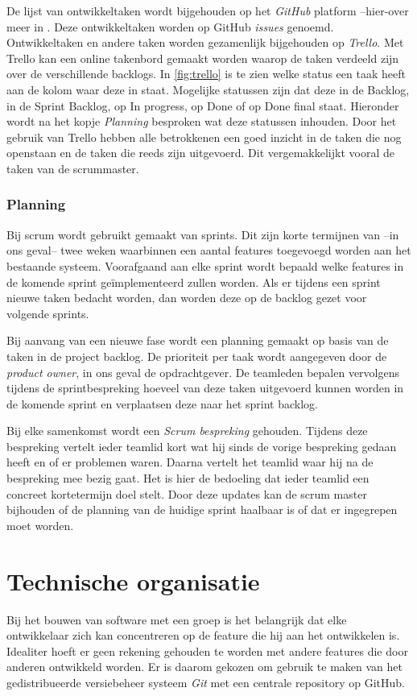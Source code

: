 De lijst van ontwikkeltaken wordt bijgehouden op het \emph{GitHub} platform --{hier-over} meer in . Deze ontwikkeltaken worden op GitHub \emph{issues} genoemd. Ontwikkeltaken en andere taken worden gezamenlijk bijgehouden op \emph{Trello}. Met Trello kan een online takenbord gemaakt worden waarop de taken verdeeld zijn over de verschillende backlogs. In \autoref{fig:trello} is te zien welke status een taak heeft aan de kolom waar deze in staat. Mogelijke statussen zijn dat deze in de Backlog, in de Sprint Backlog, op In progress, op Done of op Done final staat. Hieronder wordt na het kopje \emph{Planning} besproken wat deze statussen inhouden. Door het gebruik van Trello hebben alle betrokkenen een goed inzicht in de taken die nog openstaan en de taken die reeds zijn uitgevoerd. Dit vergemakkelijkt vooral de taken van de scrummaster.

\subsubsection{Planning}
Bij scrum wordt gebruikt gemaakt van sprints. Dit zijn korte termijnen van --in ons geval-- twee weken waarbinnen een aantal features toegevoegd worden aan het bestaande systeem. Voorafgaand aan elke sprint wordt bepaald welke features in de komende sprint geïmplementeerd zullen worden. Als er tijdens een sprint nieuwe taken bedacht worden, dan worden deze op de backlog gezet voor volgende sprints.

Bij aanvang van een nieuwe fase wordt een planning gemaakt op basis van de taken in de project backlog. De prioriteit per taak wordt aangegeven door de \emph{product owner}, in ons geval de opdrachtgever. De teamleden bepalen vervolgens tijdens de sprintbespreking hoeveel van deze taken uitgevoerd kunnen worden in de komende sprint en verplaatsen deze naar het sprint backlog.

Bij elke samenkomst wordt een \emph{Scrum bespreking} gehouden. Tijdens deze bespreking vertelt ieder teamlid kort wat hij sinds de vorige bespreking gedaan heeft en of er problemen waren. Daarna vertelt het teamlid waar hij na de bespreking mee bezig gaat. Het is hier de bedoeling dat ieder teamlid een concreet kortetermijn doel stelt. Door deze updates kan de scrum master bijhouden of de planning van de huidige sprint haalbaar is of dat er ingegrepen moet worden.

\section{Technische organisatie} \label{sec:technische_organisatie}
Bij het bouwen van software met een groep is het belangrijk dat elke ontwikkelaar zich kan concentreren op de feature die hij aan het ontwikkelen is. Idealiter hoeft er geen rekening gehouden te worden met andere features die door anderen ontwikkeld worden. Er is daarom gekozen om gebruik te maken van het gedistribueerde versiebeheer systeem \emph{Git} met een centrale repository op GitHub.

